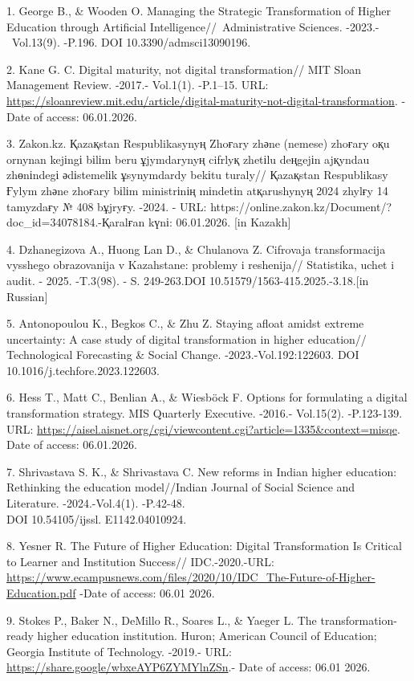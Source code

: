\begin{refs}
1. George B., \& Wooden O. Managing the Strategic Transformation of
Higher Education through Artificial Intelligence//~Administrative
Sciences. -2023.-~Vol.13(9). -P.196. DOI 10.3390/admsci13090196.

2. Kane G. C. Digital maturity, not digital transformation// MIT Sloan
Management Review. -2017.- Vol.1(1). -P.1--15. URL:
\url{https://sloanreview.mit.edu/article/digital-maturity-not-digital-transformation}.
- Date of access: 06.01.2026.

3. Zakon.kz. Қazaқstan Respublikasynyң Zhoғary zhәne (nemese) zhoғary
oқu ornynan kejіngі bіlіm beru ұjymdarynyң cifrlyқ zhetіlu deңgejіn
ajқyndau zhөnіndegі әdіstemelіk ұsynymdardy bekіtu turaly// Қazaқstan
Respublikasy Ғylym zhәne zhoғary bіlіm ministrіnің mіndetіn atқarushynyң
2024 zhylғy 14 tamyzdaғy № 408 bұjryғy. -2024. -
URL: https://online.zakon.kz/Document/?doc\_id=34078184.-Қaralғan kүnі:
06.01.2026. {[}in Kazakh{]}

4. Dzhanegizova A., Huong Lan D., \& Chulanova Z. Cifrovaja
transformacija vysshego obrazovanija v Kazahstane: problemy i
reshenija// Statistika, uchet i audit. - 2025. -T.3(98). - S.
249-263.DOI 10.51579/1563-415.2025.-3.18.{[}in Russian{]}

5. Antonopoulou K., Begkos C., \& Zhu Z. Staying afloat amidst extreme
uncertainty: A case study of digital transformation in higher
education// Technological Forecasting \& Social Change.
-2023.-Vol.192:122603. DOI 10.1016/j.techfore.2023.122603.

6. Hess T., Matt C., Benlian A., \& Wiesböck F. Options for formulating
a digital transformation strategy. MIS Quarterly Executive. -2016.-
Vol.15(2). -P.123-139. URL:
\url{https://aisel.aisnet.org/cgi/viewcontent.cgi?article=1335&context=misqe}.
Date of access: 06.01.2026.

7. Shrivastava S. K., \& Shrivastava C. New reforms in Indian higher
education: Rethinking the education model//Indian Journal of Social
Science and Literature. -2024.-Vol.4(1). -P.42-48.\\
DOI 10.54105/ijssl. E1142.04010924.

8. Yesner R. The Future of Higher Education: Digital Transformation Is
Critical to Learner and Institution Success// IDC.-2020.-URL:\\
\url{https://www.ecampusnews.com/files/2020/10/IDC_The-Future-of-Higher-Education.pdf}
-Date of access: 06.01 2026.

9. Stokes P., Baker N., DeMillo R., Soares L., \& Yaeger L. The
transformation-ready higher education institution. Huron; American
Council of Education; Georgia Institute of Technology. -2019.- URL:
\url{https://share.google/wbxeAYP6ZYMYlnZSn}.- Date of access: 06.01
2026.


\end{refs}
